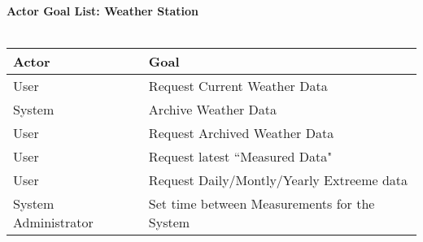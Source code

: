 \documentclass[letterpaper]{article}
\begin{document}
\noindent
\textbf{Actor Goal List:  Weather Station}\\\\
\vspace{4ex}
\begin{tabular}{|p{3.5cm}|p{5cm}|}\hline
\textbf{Actor} & \textbf{Goal}\\\hline
User & Request Current Weather Data\\\hline
System & Archive Weather Data\\\hline
User & Request Archived Weather Data\\\hline
User & Request latest ``Measured Data"\\\hline
User & Request Daily/Montly/Yearly Extreeme data\\\hline
System Administrator & Set time between Measurements for the 
System\\\hline
\end{tabular}
\end{document}
